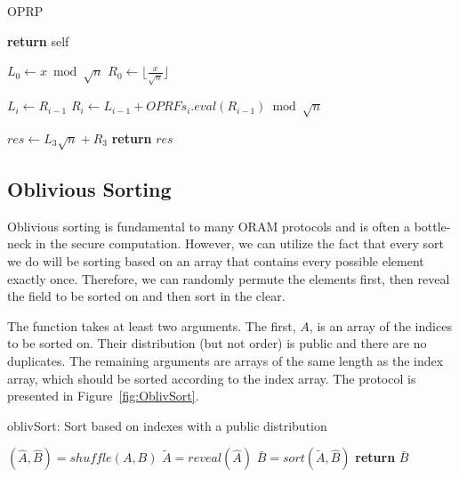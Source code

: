 \begin{algorithm}
\caption{OPRP}
\label{alg:oprp}
\begin{algorithmic}[1]

  
\State \textbf{return} self   
\EndProcedure

\State

\State $L_0 \gets x \bmod \sqrt{n}$
\State $R_0 \gets \lfloor \frac{x}{\sqrt{n}} \rfloor$

\State $L_i \gets R_{i-1}$
\State $R_i \gets L_{i-1} + OPRFs_{i}.eval(R_{i-1}) \bmod \sqrt{n}$
\EndFor

\State $res \gets L_3\sqrt{n} + R_3$
\State \textbf{return} $res$
\EndProcedure

\end{algorithmic}
\end{algorithm}
\subsection{Oblivious Sorting}

Oblivious sorting is fundamental to many ORAM protocols and is often
a bottle-neck in the secure computation.
However, we can utilize the fact that every sort we do will be sorting
based on an array that contains every possible element exactly once.
Therefore, we can randomly permute the elements first,
then reveal the field to be sorted on and then sort in the clear.

The function takes at least two arguments. 
The first, $A$, is an array of the indices to be sorted on.
Their distribution (but not order) is public and there are no duplicates.
The remaining arguments are arrays of the same length as the index array,
which should be sorted according to the index array.
The protocol is presented in Figure~\ref{fig:OblivSort}.


\begin{algorithm}
\caption{oblivSort: Sort based on indexes with a public distribution}
\label{fig:OblivSort}
\begin{algorithmic}[0]

\State $(\hat{A} , \hat{B}) = shuffle(A, B)$
\State $\tilde{A} = reveal(\hat{A})$
\State $\bar{B} = sort(\tilde{A}, \hat{B})$
\State \textbf{return} $\bar{B}$
\EndProcedure

\end{algorithmic}
\end{algorithm}


